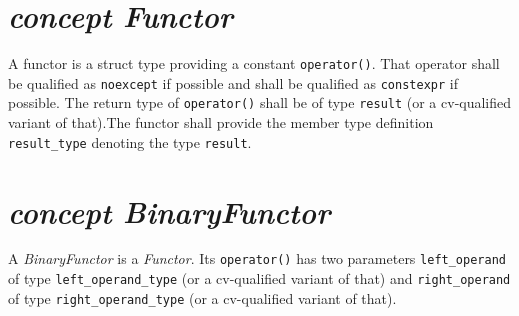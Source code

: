 %
%
%
%
%
%
%


\section{\textit{concept Functor}}
A functor is a struct type providing a constant  \texttt{operator()}.
That operator shall be qualified as \texttt{noexcept}     if possible
and shall be qualified as \texttt{constexpr} if possible.  The return
type of \texttt{operator()} shall be of type \texttt{result}    (or a
cv-qualified variant of that).\newline\noindent{}The functor    shall
provide the member type definition \texttt{result\_type} denoting the
type \texttt{result}.

\section{\textit{concept BinaryFunctor}}
A \textit{BinaryFunctor} is a \textit{Functor}.
Its \texttt{operator()} has two parameters \texttt{left\_operand} of type
\texttt{left\_operand\_type} (or a cv-qualified variant of that)      and 
\texttt{right\_operand} of type \texttt{right\_operand\_type} (or       a
cv-qualified variant of that).\newline

